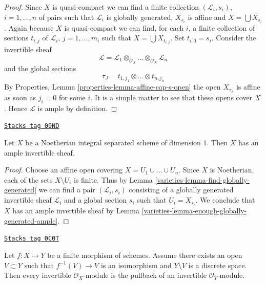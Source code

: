 \begin{proof}
Since $X$ is quasi-compact we can find a finite collection
$(\mathcal{L}_i, s_i)$, $i = 1, \ldots, n$
of pairs such that $\mathcal{L}_i$ is globally generated, $X_{s_i}$
is affine and $X = \bigcup X_{s_i}$.
Again because $X$ is quasi-compact we can find, for each $i$, a finite
collection of sections $t_{i, j}$ of $\mathcal{L}_i$, $j = 1, \ldots, m_i$
such that $X = \bigcup X_{t_{i, j}}$. Set $t_{i, 0} = s_i$.
Consider the invertible sheaf
$$
\mathcal{L} = \mathcal{L}_1
\otimes_{\mathcal{O}_X} \ldots
\otimes_{\mathcal{O}_X} \mathcal{L}_n
$$
and the global sections
$$
\tau_J = t_{1, j_1} \otimes \ldots \otimes t_{n, j_n}
$$
By Properties, Lemma \ref{properties-lemma-affine-cap-s-open}
the open $X_{\tau_J}$ is affine as soon as $j_i = 0$ for some $i$.
It is a simple matter to see that these opens cover $X$.
Hence $\mathcal{L}$ is ample by definition.
\end{proof}

\begin{lemma}
\label{varieties-lemma-dim-1-noetherian-integral-separated-has-ample}
\href{https://stacks.math.columbia.edu/tag/09ND}{\texttt{Stacks tag 09ND}}

Let $X$ be a Noetherian integral separated scheme of dimension $1$.
Then $X$ has an ample invertible sheaf.
\end{lemma}

\begin{proof}

Choose an affine open covering $X = U_1 \cup \ldots \cup U_n$.
Since $X$ is Noetherian, each of the sets $X \setminus U_i$ is finite.
Thus by Lemma \ref{varieties-lemma-find-globally-generated}
we can find a pair $(\mathcal{L}_i, s_i)$
consisting of a globally generated invertible sheaf $\mathcal{L}_i$
and a global section $s_i$ such that $U_i = X_{s_i}$.
We conclude that $X$ has an ample invertible sheaf by
Lemma \ref{varieties-lemma-enough-globally-generated-ample}.
\end{proof}

\begin{lemma}
\label{varieties-lemma-surjective-pic-birational-finite}
\href{https://stacks.math.columbia.edu/tag/0C0T}{\texttt{Stacks tag 0C0T}}

Let $f : X \to Y$ be a finite morphism of schemes. Assume there
exists an open $V \subset Y$ such that $f^{-1}(V) \to V$ is an
isomorphism and $Y \setminus V$ is a discrete space. Then every
invertible $\mathcal{O}_X$-module is the pullback of an invertible
$\mathcal{O}_Y$-module.
\end{lemma}

